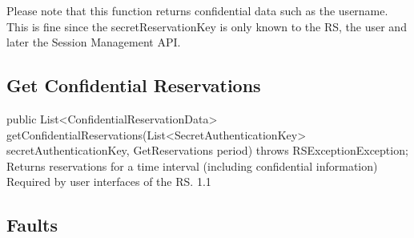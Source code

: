 \documentclass[a4paper,11pt]{article}
\begin{document}
Please note that this function returns confidential data such as the username. This is fine since the secretReservationKey is only known to the RS, the user and later the Session Management API. 


			\sectionfin
			\subsection{Get Confidential Reservations}

\begin{apidoc}
	{public List<ConfidentialReservationData> getConfidentialReservations(List<SecretAuthenticationKey> secretAuthenticationKey, GetReservations period) throws RSExceptionException;} %
	{Returns reservations for a time interval (including confidential information)} %
	{
	} %
	{} %
	{Required by user interfaces of the RS.} %
	{1.1} %
\end{apidoc}

	
	
			\sectionfin
			\subsection{Faults}
	

    
    
	\sectionfin
\end{document}
